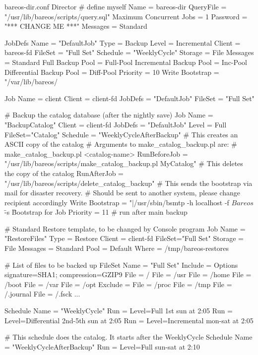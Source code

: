\begin{bconfig}{bareos-dir.conf}
Director {          # define myself
  Name = bareos-dir
  QueryFile = "/usr/lib/bareos/scripts/query.sql"
  Maximum Concurrent Jobs = 1
  Password = "*** CHANGE ME ***"
  Messages = Standard
}

JobDefs {
  Name = "DefaultJob"
  Type = Backup
  Level = Incremental
  Client = bareos-fd
  FileSet = "Full Set"
  Schedule = "WeeklyCycle"
  Storage = File
  Messages = Standard
  Full Backup Pool = Full-Pool
  Incremental Backup Pool = Inc-Pool
  Differential Backup Pool = Diff-Pool
  Priority = 10
  Write Bootstrap = "/var/lib/bareos/%
}

Job {
  Name = client
  Client = client-fd
  JobDefs = "DefaultJob"
  FileSet = "Full Set"
}

# Backup the catalog database (after the nightly save)
Job {
  Name = "BackupCatalog"
  Client = client-fd
  JobDefs = "DefaultJob"
  Level = Full
  FileSet="Catalog"
  Schedule = "WeeklyCycleAfterBackup"
  # This creates an ASCII copy of the catalog
  # Arguments to make_catalog_backup.pl are:
  #  make_catalog_backup.pl <catalog-name>
  RunBeforeJob = "/usr/lib/bareos/scripts/make_catalog_backup.pl MyCatalog"
  # This deletes the copy of the catalog
  RunAfterJob  = "/usr/lib/bareos/scripts/delete_catalog_backup"
  # This sends the bootstrap via mail for disaster recovery.
  # Should be sent to another system, please change recipient accordingly
  Write Bootstrap = "|/usr/sbin/bsmtp -h localhost -f \"\(Bareos\) \" -s \"Bootstrap for Job %
  Priority = 11                   # run after main backup
}

# Standard Restore template, to be changed by Console program
Job {
  Name = "RestoreFiles"
  Type = Restore
  Client = client-fd
  FileSet="Full Set"
  Storage = File
  Messages = Standard
  Pool = Default
  Where = /tmp/bareos-restores
}

# List of files to be backed up
FileSet {
  Name = "Full Set"
  Include = {
    Options {
      signature=SHA1;
      compression=GZIP9
    }
    File = /
    File = /usr
    File = /home
    File = /boot
    File = /var
    File = /opt
  }
  Exclude = {
    File = /proc
    File = /tmp
    File = /.journal
    File = /.fsck
    ...
  }
}

Schedule {
  Name = "WeeklyCycle"
  Run = Level=Full 1st sun at 2:05
  Run = Level=Differential 2nd-5th sun at 2:05
  Run = Level=Incremental mon-sat at 2:05
}

# This schedule does the catalog. It starts after the WeeklyCycle
Schedule {
  Name = "WeeklyCycleAfterBackup"
  Run = Level=Full sun-sat at 2:10
}


\end{bconfig}
